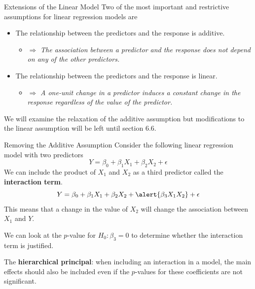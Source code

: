 \documentclass[
  ignorenonframetext,
  aspectratio=169,
]{beamer}
\providecommand{\tightlist}{%
  \setlength{\itemsep}{0pt}\setlength{\parskip}{0pt}}\usepackage{longtable,booktabs,array}
\begin{document}
\begin{frame}{Extensions of the Linear Model}
\protect\hypertarget{extensions-of-the-linear-model}{}
Two of the most important and restrictive assumptions for linear
regression models are

\begin{itemize}
\tightlist
\item
  The relationship between the predictors and the response is
  \alert{additive}.

  \begin{itemize}
  \tightlist
  \item
    \(\Rightarrow\) \emph{The association between a predictor and the
    response does not depend on any of the other predictors.}
  \end{itemize}
\item
  The relationship between the predictors and the response is
  \alert{linear}.

  \begin{itemize}
  \tightlist
  \item
    \(\Rightarrow\) \emph{A one-unit change in a predictor induces a
    constant change in the response regardless of the value of the
    predictor.}
  \end{itemize}
\end{itemize}

We will examine the relaxation of the additive assumption but
modifications to the linear assumption will be left until section 6.6.
\end{frame}

\begin{frame}{Removing the Additive Assumption}
\protect\hypertarget{removing-the-additive-assumption}{}
Consider the following linear regression model with two predictors \[
Y=\beta_{0}+\beta_{1} X_{1}+\beta_{2} X_{2}+\epsilon
\] We can include the product of \(X_1\) and \(X_2\) as a third
predictor called the \textbf{interaction term}.
\[Y=\beta_{0}+\beta_{1} X_{1}+\beta_{2} X_{2}+\alert{\beta_{3} X_{1} X_{2}}+\epsilon\]
This means that a change in the value of \(X_2\) will change the
association between \(X_1\) and \(Y\).

We can look at the \(p\)-value for \(H_0: \beta_3 = 0\) to determine
whether the interaction term is justified.

The \textbf{hierarchical principal}: when including an interaction in a
model, the main effects should also be included even if the \(p\)-values
for these coefficients are not significant.
\end{frame}
\end{document}

